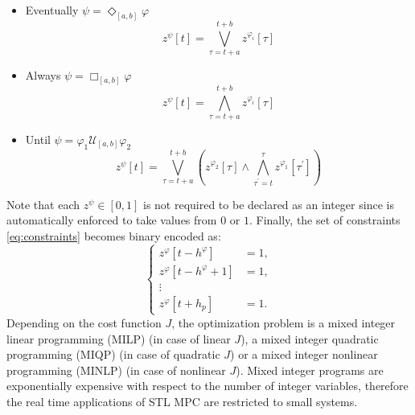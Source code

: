 \documentclass[letterpaper, 10 pt, conference]{ieeeconf}
\begin{document}
\begin{itemize}
\item Eventually $\psi=\Diamond_{[a,b]} \varphi$
\begin{equation}
z^\psi[t] = \bigvee_{\tau=t+a}^{t+b} z^{\varphi_i}[\tau]
\end{equation}
\item Always $\psi=\Box_{[a,b]} \varphi$
\begin{equation}
z^\psi[t] = \bigwedge_{\tau=t+a}^{t+b} z^{\varphi_i}[\tau] 
\end{equation}
\item Until $\psi=\varphi_1\mathcal{U}_{[a,b]} \varphi_2$
\begin{equation}
z^\psi[t] = \bigvee_{\tau=t+a}^{t+b} (z^{\varphi_2}[\tau]  \wedge \bigwedge_{\tau^\prime=t}^{\tau} z^{\varphi_1}[\tau^\prime])
\end{equation}
\end{itemize}
Note that each $z^\psi \in [0,1]$ is not required to be declared as an integer since is automatically enforced to take values from $0$ or $1$. Finally, the set of constraints \eqref{eq:constraints} becomes binary encoded as:
\begin{equation}
\left \{
\begin{array}{cc}
z^\varphi[t-h^\varphi] & = 1, \\
z^\varphi[t-h^\varphi+1] & = 1, \\
\vdots & \\ 
z^\varphi[t+h_p] & = 1.
\end{array}
\right.
\end{equation}
Depending on the cost function $J$, the optimization problem is a mixed integer linear programming (MILP) (in case of linear $J$), a mixed integer quadratic programming (MIQP) (in case of quadratic $J$) or a mixed integer nonlinear programming (MINLP) (in case of nonlinear $J$). Mixed integer programs are exponentially expensive with respect to the number of integer variables, therefore the real time applications of STL MPC are restricted to small systems.

 
\end{document}
